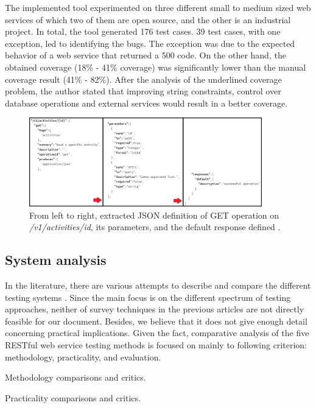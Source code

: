\documentclass[english]{tktltiki}
\begin{document}
The implemented tool experimented on three different small to medium sized web services of which two of them are open source, and the other is an industrial project. In total, the tool generated 176 test cases. 39 test cases, with one exception, led to identifying the bugs. The exception was due to the expected behavior of a web service that returned a 500 code. On the other hand, the obtained coverage (18\% - 41\% coverage) was significantly lower than the manual coverage result (41\% - 82\%). After the analysis of the underlined coverage problem, the author stated that improving string constraints, control over database operations and external services would result in a better coverage.
\begin{figure}[h]
	\begin{center}
		\includegraphics[width=0.9\textwidth]{images/swagger_c.png}
		\caption{From left to right, extracted JSON definition of GET operation on \textit{/v1/activities/{id}}, its parameters, and the default response defined \cite{arcuri2017restful}. }
		\label{fig:swagger}
	\end{center}
\end{figure}
\subsection{System analysis}
In the literature, there are various attempts to describe and compare the different testing systems \cite{canfora2006testing, canfora2009service, bozkurt2013testing}. Since the main focus is on the different spectrum of testing approaches, neither of survey techniques in the previous articles are not directly feasible for our document. Besides, we believe that it does not give enough detail concerning practical implications. Given the fact, comparative analysis of the five RESTful web service testing methods is focused on mainly to following criterion: methodology, practicality, and evaluation.

Methodology comparisons and critics.

Practicality comparisons and critics.
\end{document}
